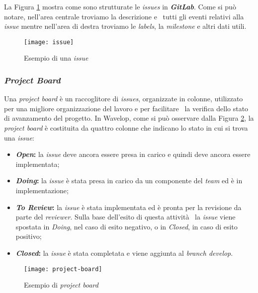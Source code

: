 La Figura \ref{fig:issue} mostra come sono strutturate le \emph{issues} in \textbf{\emph{GitLab}}. Come si può notare, nell'area centrale troviamo la descrizione e \
tutti gli eventi relativi alla \emph{issue} mentre nell'area di destra troviamo le \emph{labels}, la \emph{milestone} e altri dati utili.
\begin{figure}[!ht]
  \begin{center}
    \texttt{[image: issue]}
    \caption{Esempio di una \emph{issue}}
    \label{fig:issue}
  \end{center}
\end{figure}

\newpage
\subsubsection{\emph{Project Board}}
Una \emph{project board} è un raccoglitore di \emph{issues}, organizzate in colonne, utilizzato per una migliore organizzazione del lavoro e per facilitare \
la verifica dello stato di avanzamento del progetto. In Wavelop, come si può osservare dalla Figura \ref{fig:board}, la \emph{project board} è costituita da quattro colonne che indicano lo stato in cui si trova una \emph{issue}:

\begin{itemize}
  \item \textbf{\emph{Open}:} la \emph{issue} deve ancora essere presa in carico e quindi deve ancora essere implementata;
  \item \textbf{\emph{Doing}:} la \emph{issue} è stata presa in carico da un componente del \emph{team} ed è in implementazione;
  \item \textbf{\emph{To Review}:} la \emph{issue} è stata implementata ed è pronta per la revisione da parte del \emph{reviewer}. Sulla base dell'esito di questa attività \
  la \emph{issue} viene spostata in \emph{Doing}, nel caso di esito negativo, o in \emph{Closed}, in caso di esito positivo;
  \item \textbf{\emph{Closed}:} la \emph{issue} è stata completata e viene aggiunta al \emph{branch develop}.
\end{itemize}
\begin{figure}[!ht]
  \begin{center}
    \texttt{[image: project-board]}
    \caption{Esempio di \emph{project board}}
    \label{fig:board}
  \end{center}
\end{figure}

